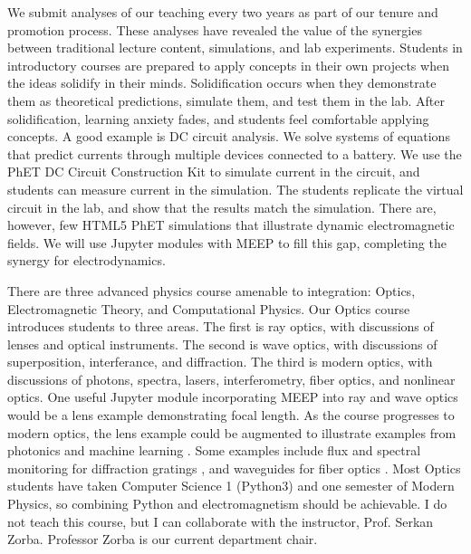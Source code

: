 \documentclass[../../main.tex]{subfiles}
\begin{document}
We submit analyses of our teaching every two years as part of our tenure and promotion process.  These analyses have revealed the value of the synergies between traditional lecture content, simulations, and lab experiments.  Students in introductory courses are prepared to apply concepts in their own projects when the ideas solidify in their minds.  Solidification occurs when they demonstrate them as theoretical predictions, simulate them, and test them in the lab.  After solidification, learning anxiety fades, and students feel comfortable applying concepts.  A good example is DC circuit analysis.  We solve systems of equations that predict currents through multiple devices connected to a battery.  We use the PhET DC Circuit Construction Kit to simulate current in the circuit, and students can measure current in the simulation.  The students replicate the virtual circuit in the lab, and show that the results match the simulation.  There are, however, few HTML5 PhET simulations that illustrate dynamic electromagnetic fields.  We will use Jupyter modules with MEEP to fill this gap, completing the synergy for electrodynamics. \\ \vspace{2.5mm}

There are three advanced physics course amenable to integration: Optics, Electromagnetic Theory, and Computational Physics.  Our Optics course introduces students to three areas.  The first is ray optics, with discussions of lenses and optical instruments.  The second is wave optics, with discussions of superposition, interferance, and diffraction. The third is modern optics, with discussions of photons, spectra, lasers, interferometry, fiber optics, and nonlinear optics.  One useful Jupyter module incorporating MEEP into ray and wave optics would be a lens example demonstrating focal length.  As the course progresses to modern optics, the lens example could be augmented to illustrate examples from photonics and machine learning \cite{meepcon2022_3}.  Some examples include flux and spectral monitoring for diffraction gratings \cite{meepcon2022_4}, and waveguides for fiber optics \cite{meepcon2022_5}.  Most Optics students have taken Computer Science 1 (Python3) and one semester of Modern Physics, so combining Python and electromagnetism should be achievable.  I do not teach this course, but I can collaborate with the instructor, Prof. Serkan Zorba. Professor Zorba is our current department chair.  \\ \vspace{2.5mm}
\end{document}
